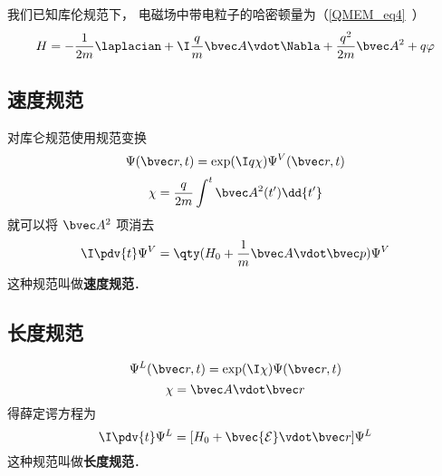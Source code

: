 
\begin{issues}
\issueDraft
\end{issues}


我们已知库伦规范下， 电磁场中带电粒子的哈密顿量为（\autoref{QMEM_eq4}~）
\begin{equation}
H = -\frac{1}{2m} \laplacian + \I \frac{q}{m} \bvec A \vdot \Nabla + \frac{q^2}{2m} \bvec A^2 + q\varphi
\end{equation}

\subsection{速度规范}
对库仑规范使用规范变换
\begin{equation}\label{LVgaug_eq3}
\Psi(\bvec r, t) = \exp(\I q\chi)\Psi^V(\bvec r, t)
\end{equation}
\begin{equation}\label{LVgaug_eq4}
\chi = \frac{q}{2m} \int^t \bvec A^2(t') \dd{t'}
\end{equation}
就可以将 $\bvec A^2$ 项消去
\begin{equation}
\I \pdv{t} \Psi^V = \qty(H_0 + \frac{1}{m} \bvec A \vdot \bvec p) \Psi^V
\end{equation}
这种规范叫做\textbf{速度规范}．

\subsection{长度规范}

\begin{equation}
\Psi^L(\bvec r, t) =  \exp(\I \chi) \Psi(\bvec r, t)
\end{equation}
\begin{equation}
\chi = \bvec A \vdot \bvec r
\end{equation}
得薛定谔方程为
\begin{equation}
\I \pdv{t} \Psi^L = [H_0 + \bvec{\mathcal{E}} \vdot \bvec r] \Psi^L
\end{equation}
这种规范叫做\textbf{长度规范}．
